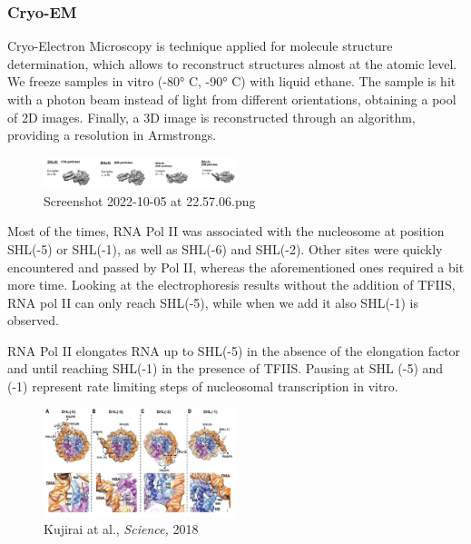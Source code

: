 \hypertarget{cryo-em}{%
\subsubsection{Cryo-EM}\label{cryo-em}}

Cryo-Electron Microscopy is technique applied for molecule structure determination, which allows to reconstruct structures almost at the atomic level. We freeze samples in vitro (-80° C, -90° C) with liquid ethane. The sample is hit with a photon beam instead of light from different orientations, obtaining a pool of 2D images. Finally, a 3D image is reconstructed through an algorithm, providing a resolution in Armstrongs.

\begin{figure}
\centering
\includegraphics[width=0.5\textwidth]{../_resources/Screenshot_2022-10-05_at_22-57-06.png}
\caption{Screenshot 2022-10-05 at 22.57.06.png}
\end{figure}

Most of the times, RNA Pol II was associated with the nucleosome at position SHL(-5) or SHL(-1), as well as SHL(-6) and SHL(-2). Other sites were quickly encountered and passed by Pol II, whereas the aforementioned ones required a bit more time. Looking at the electrophoresis results without the addition of TFIIS, RNA pol II can only reach SHL(-5), while when we add it also SHL(-1) is observed.

RNA Pol II elongates RNA up to SHL(-5) in the absence of the elongation factor and until reaching SHL(-1) in the presence of TFIIS. Pausing at SHL (-5) and (-1) represent rate limiting steps of nucleosomal transcription in vitro.

\begin{figure}
\centering
\includegraphics[width=0.5\textwidth]{../_resources/Screenshot_2022-10-05_at_22-54-39.png}
\caption{Kujirai at al., \emph{Science,} 2018}
\end{figure}


